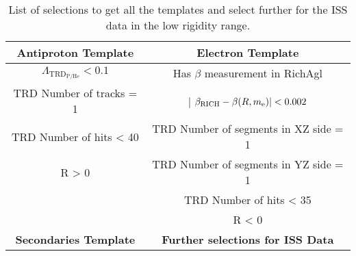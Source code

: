 \begin{table}[h]
\setlength\tabcolsep{15pt}
\centering
\caption{List of selections to get all the templates and select further for the ISS data in the low rigidity range.} 
\label{LowRigiditySelectionsForTemplates}
\begin{tabular}{cc}
\hline \textbf{Antiproton Template}                                                                                                                             &  \textbf{Electron Template}                                                                                                                            \\
\hline $ \Lambda_{\mathrm{TRD}_{\mathrm{P/He}}} < 0.1$                                                                                     &   Has $\beta$ measurement in RichAgl                                                                                                           \\
\hline TRD Number of tracks = 1                   &   | $ \beta_\mathrm{RICH} - \beta(R,m_{{\rm{e}}}) | <  0.002 $         \\
\hline TRD Number of hits < 40                     &   TRD Number of segments in XZ side = 1                                                     \\
\hline R > 0                                                    &   TRD Number of segments in YZ side = 1                                                     \\
\hline                                                              &   TRD Number of hits < 35                                                                             \\
\hline                                                              &    R < 0                                                                                                           \\
\hline       
\hline \textbf{Secondaries Template}                                                                   & \textbf{Further selections for ISS Data}               \\

\end{tabular}
\end{table}
